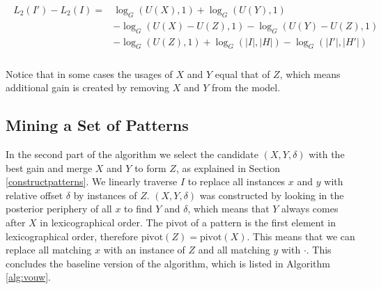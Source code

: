 \documentclass{llncs}
\begin{document}
\begin{align}
\begin{split}
	L_2(I') - L_2(I) = &\log_G(U(X),1) + \log_G(U(Y),1) \\
			      &- \log_G(U(X)-U(Z),1) - \log_G(U(Y)-U(Z),1) \\
			      &- \log_G(U(Z),1) + \log_G(|I|,|H|) - \log_G(|I'|,|H'|) \\
\end{split}   
\end{align}

\noindent Notice that in some cases the usages of $X$ and $Y$ equal that of $Z$, which means additional gain is created by removing $X$ and $Y$ from the model. 

\subsection{Mining a Set of Patterns}

In the second part of the algorithm we select the candidate $(X,Y,\delta)$ with the best gain and merge $X$ and $Y$ to form $Z$, as explained in Section \ref{constructpatterns}. We linearly traverse $I$ to replace all instances $x$ and $y$ with relative offset $\delta$  by instances of $Z$. $(X,Y,\delta)$ was constructed by looking in the posterior periphery of all $x$ to find $Y$ and $\delta$, which means that $Y$ always comes after $X$ in lexicographical order. The pivot of a pattern is the first element in lexicographical order, therefore $\mathrm{pivot}(Z) = \mathrm{pivot}(X)$. This means that we can replace all matching $x$ with an instance of $Z$ and all matching $y$ with $\cdot$. This concludes the baseline version of the algorithm, which is listed in Algorithm \ref{alg:vouw}. 
\end{document}
